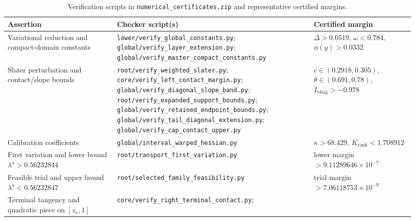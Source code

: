 \documentclass[11pt]{article}
\numberwithin{equation}{section}
\theoremstyle{plain}
\theoremstyle{definition}
\newcommand{\1}{\mathbf{1}}
\begin{document}
\begin{table}[!t]
\centering
\footnotesize
\caption{Verification scripts in \texttt{numerical\_certificates.zip} and representative certified margins.}
\label{tab:checkers}
\vspace{4pt}
\begin{tabular}{@{}
  >{\raggedright\arraybackslash}p{0.25\linewidth}
  >{\raggedright\arraybackslash}p{0.45\linewidth}
  >{\raggedright\arraybackslash}p{0.23\linewidth}@{}}
\toprule
\textbf{Assertion} & \textbf{Checker script(s)} & \textbf{Certified margin} \\
\midrule
Variational reduction and compact-domain constants &
  \texttt{lower/verify\_global\_constants.py};\newline
  \texttt{global/verify\_layer\_extension.py};\newline
  \texttt{global/verify\_master\_compact\_constants.py} &
  $\Delta > 0.0519$, $\omega < 0.784$, $\phi(y) > 0.0332$ \\[3pt]
Slater perturbation and contact/slope bounds &
  \texttt{root/verify\_weighted\_slater.py};\newline
  \texttt{core/verify\_left\_contact\_margin.py};\newline
  \texttt{global/verify\_diagonal\_slope\_band.py};\newline
  \texttt{root/verify\_expanded\_support\_bounds.py};\newline
  \texttt{global/verify\_retained\_endpoint\_bounds.py};\newline
  \texttt{global/verify\_tail\_diagonal\_extension.py};\newline
  \texttt{global/verify\_cap\_contact\_upper.py} &
  $c \in (0.2918, 0.305)$, $\theta \in (0.691, 0.78)$, $L_{\mathrm{diag}} > -0.978$ \\[3pt]
Calibration coefficients &
  \texttt{global/interval\_warped\_hessian.py} &
  $\kappa > 68.429$, $K_{\mathrm{rank}} < 1.708912$ \\[3pt]
First variation and lower bound $\lambda^\star > 0.56232844$ &
  \texttt{root/transport\_first\_variation.py} &
  lower margin $> 9.11289646 \times 10^{-7}$ \\[3pt]
Feasible trial and upper bound $\lambda^\star < 0.56232847$ &
  \texttt{root/selected\_family\_feasibility.py} &
  trial margin $> 7.06118753 \times 10^{-9}$ \\[3pt]
Terminal tangency and quadratic piece on $[z_\star, 1]$ &
  \texttt{core/verify\_right\_terminal\_contact.py};\newline

\end{tabular}
\end{table}
\end{document}
